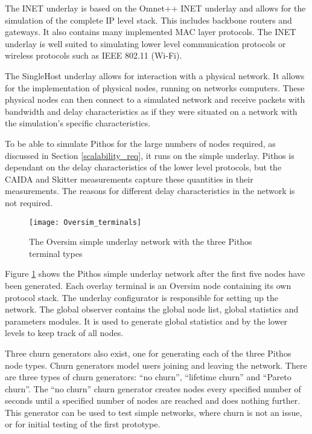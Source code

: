 The INET underlay is based on the Omnet++ INET underlay and allows for the simulation of the complete IP level stack. This includes backbone routers and gateways. It also contains many implemented MAC layer protocols. The INET underlay is well suited to simulating lower level communication protocols or wireless protocols such as IEEE 802.11 (Wi-Fi).

The SingleHost underlay allows for interaction with a physical network. It allows for the implementation of physical nodes, running on networks computers. These physical nodes can then connect to a simulated network and receive packets with bandwidth and delay characteristics as if they were situated on a network with the simulation's specific characteristics.

To be able to simulate Pithos for the large numbers of nodes required, as discussed in Section \ref{scalability_req}, it runs on the simple underlay. Pithos is dependant on the delay characteristics of the lower level protocols, but the CAIDA and Skitter measurements capture these quantities in their measurements. The reasons for different delay characteristics in the network is not required.

\begin{figure}[htbp]
 \centering
 \texttt{[image: Oversim\_terminals]}
 \caption{The Oversim simple underlay network with the three Pithos terminal types}
 \label{fig_oversim_terminals}
\end{figure}

Figure \ref{fig_oversim_terminals} shows the Pithos simple underlay network after the first five nodes have been generated. Each overlay terminal is an Oversim node containing its own protocol stack. The underlay configurator is responsible for setting up the network. The global observer contains the global node list, global statistics and parameters modules. It is used to generate global statistics and by the lower levels to keep track of all nodes.

Three churn generators also exist, one for generating each of the three Pithos node types. Churn generators model users joining and leaving the network. There are three types of churn generators: ``no churn'', ``lifetime churn'' and ``Pareto churn''. The ``no churn'' churn generator creates nodes every specified number of seconds until a specified number of nodes are reached and does nothing further. This generator can be used to test simple networks, where churn is not an issue, or for initial testing of the first prototype.


